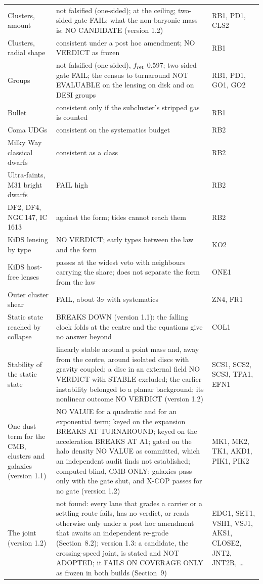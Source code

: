 \documentclass[10pt]{article}
\begin{document}
{\begin{longtable}{@{}p{4.0cm}p{9.4cm}p{2.5cm}@{}}
Clusters, amount & not falsified (one-sided); at the ceiling; two-sided gate FAIL; what the non-baryonic mass is: NO CANDIDATE (version 1.2) & RB1, PD1, CLS2\\
Clusters, radial shape & consistent under a post hoc amendment; NO VERDICT as frozen & RB1\\
Groups & not falsified (one-sided), $f_{\rm ret}$ 0.597; two-sided gate FAIL; the census to turnaround NOT EVALUABLE on the lensing on disk and on DESI groups & RB1, PD1, GO1, GO2\\
Bullet & consistent only if the subcluster's stripped gas is counted & RB1\\
Coma UDGs & consistent on the systematics budget & RB2\\
Milky Way classical dwarfs & consistent as a class & RB2\\
Ultra-faints, M31 bright dwarfs & FAIL high & RB2\\
DF2, DF4, NGC\,147, IC\,1613 & against the form; tides cannot reach them & RB2\\
KiDS lensing by type & NO VERDICT; early types between the law and the form & KO2\\
KiDS host-free lenses & passes at the widest veto with neighbours carrying the share; does not separate the form from the law & ONE1\\
Outer cluster shear & FAIL, about 3$\sigma$ with systematics & ZN4, FR1\\
Static state reached by collapse & BREAKS DOWN (version 1.1): the falling clock folds at the centre and the equations give no answer beyond & COL1\\
Stability of the static state & linearly stable around a point mass and, away from the centre, around isolated discs with gravity coupled; a disc in an external field NO VERDICT with STABLE excluded; the earlier instability belonged to a planar background; its nonlinear outcome NO VERDICT (version 1.2) & SCS1, SCS2, SCS3, TPA1, EFN1\\
One dust term for the CMB, clusters and galaxies (version 1.1) & NO VALUE for a quadratic and for an exponential term; keyed on the expansion BREAKS AT TURNAROUND; keyed on the acceleration BREAKS AT A1; gated on the halo density NO VALUE as committed, which an independent audit finds not established; computed blind, CMB-ONLY: galaxies pass only with the gate shut, and X-COP passes for no gate (version 1.2) & MK1, MK2, TK1, AKD1, PIK1, PIK2\\
The joint (version 1.2) & not found: every lane that grades a carrier or a settling route fails, has no verdict, or reads otherwise only under a post hoc amendment that awaits an independent re-grade (Section~8.2); version 1.3: a candidate, the crossing-speed joint, is stated and NOT ADOPTED; it FAILS ON COVERAGE ONLY as frozen in both builds (Section~9) & EDG1, SET1, VSH1, VSJ1, AKS1, CLOSE2, JNT2, JNT2R, \dots\\

\end{longtable}}
\end{document}
